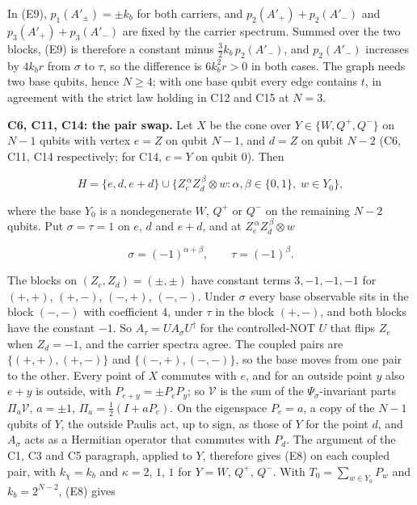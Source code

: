 \documentclass[11pt,a4paper]{article}
\newcommand{\gt}{>}
\begin{document}
In (E9), \(p_1(A'_\pm)=\pm k_b\) for both carriers, and \(p_2(A'_+)+p_2(A'_-)\) and
\(p_3(A'_+)+p_3(A'_-)\) are fixed by the carrier spectrum. Summed over the two blocks, (E9) is therefore a
constant minus \(\tfrac32k_b\,p_2(A'_-)\), and \(p_2(A'_-)\) increases by \(4k_br\) from \(\sigma\) to \(\tau\), so the
difference is \(6k_b^2r\gt0\) in both cases. The graph needs two base qubits, hence \(N\ge4\); with one
base qubit every edge contains \(t\), in agreement with the strict law holding in C12 and C15 at \(N=3\).

\textbf{C6, C11, C14: the pair swap.} Let \(X\) be the cone over \(Y\in\{W,Q^+,Q^-\}\) on \(N-1\) qubits with vertex
\(e=Z\) on qubit \(N-1\), and \(d=Z\) on qubit \(N-2\) (C6, C11, C14 respectively; for C14, \(c=Y\) on qubit 0).
Then

\[H=\{e,d,e+d\}\cup\{Z_e^{\,\alpha}Z_d^{\,\beta}\otimes w:\alpha,\beta\in\{0,1\},\;w\in Y_0\},\]

where the base \(Y_0\) is a nondegenerate \(W\), \(Q^+\) or \(Q^-\) on the remaining \(N-2\) qubits. Put
\(\sigma=\tau=1\) on \(e\), \(d\) and \(e+d\), and at \(Z_e^{\,\alpha}Z_d^{\,\beta}\otimes w\)

\[\sigma=(-1)^{\alpha+\beta},\qquad\tau=(-1)^{\beta}.
\tag{E11}\]

The blocks on \((Z_e,Z_d)=(\pm,\pm)\) have constant terms \(3,-1,-1,-1\) for \((+,+)\), \((+,-)\), \((-,+)\), \((-,-)\).
Under \(\sigma\) every base observable sits in the block \((-,-)\) with coefficient 4, under \(\tau\) in the block
\((+,-)\), and both blocks have the constant \(-1\). So \(A_\tau=UA_\sigma U^\dagger\) for the controlled-NOT \(U\)
that flips \(Z_e\) when \(Z_d=-1\), and the carrier spectra agree. The coupled pairs are
\(\{(+,+),(+,-)\}\) and \(\{(-,+),(-,-)\}\), so the base moves from one pair to the other. Every point of
\(X\) commutes with \(e\), and for an outside point \(y\) also \(e+y\) is outside, with \(P_{e+y}=\pm P_eP_y\); so
\(\mathcal V\) is the sum of the \(\Psi_\sigma\)-invariant parts \(\Pi_a\mathcal V\), \(a=\pm1\), \(\Pi_a=\frac12(I+aP_e)\).
On the eigenspace \(P_e=a\), a copy of the \(N-1\) qubits of \(Y\), the outside Paulis act, up to sign, as
those of \(Y\) for the point \(d\), and \(A_\sigma\) acts as a Hermitian operator that commutes with \(P_d\). The
argument of the C1, C3 and C5 paragraph, applied to \(Y\), therefore gives (E8) on each coupled pair, with
\(k_\chi=k_b\) and \(\kappa=2\), \(1\), \(1\) for \(Y=W\), \(Q^+\), \(Q^-\). With
\(T_0=\sum_{w\in Y_0}P_w\) and \(k_b=2^{N-2}\), (E8) gives
\end{document}
